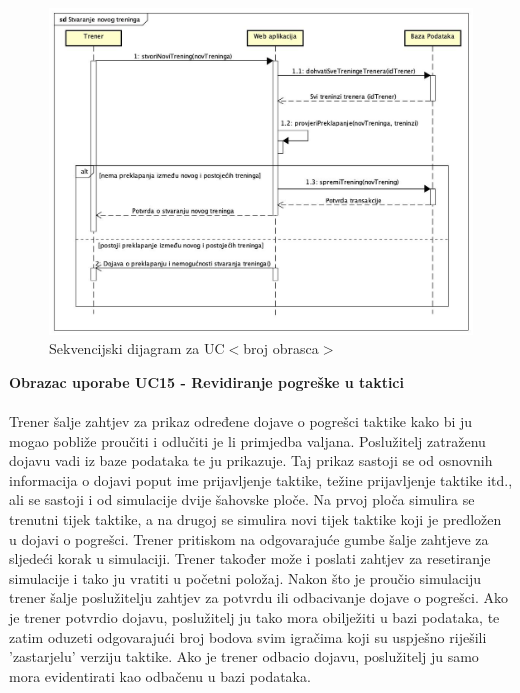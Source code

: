				\begin{figure}[H]
					\centerfloat
        					\includegraphics[scale=0.48]{dijagrami/StvaranjeNovogTreninga.jpg} %
        					\caption{Sekvencijski dijagram za UC$<$broj obrasca$>$}
        					\label{fig:UC$<$broj obrasca$>$}
				\end{figure}
				
				\eject
				
				\textbf{Obrazac uporabe UC15 - Revidiranje pogreške u taktici}\\
				\\Trener šalje zahtjev za prikaz određene dojave o pogrešci taktike kako bi ju mogao pobliže proučiti i odlučiti je li primjedba valjana. Poslužitelj zatraženu dojavu vadi iz baze podataka te ju prikazuje. Taj prikaz sastoji se od osnovnih informacija o dojavi poput ime prijavljenje taktike, težine prijavljenje taktike itd., ali se sastoji i od simulacije dvije šahovske ploče. Na prvoj ploča simulira se trenutni tijek taktike, a na drugoj se simulira novi tijek taktike koji je predložen u dojavi o pogrešci. Trener pritiskom na odgovarajuće gumbe šalje zahtjeve za sljedeći korak u simulaciji. Trener također može i poslati zahtjev za resetiranje simulacije i tako ju vratiti u početni položaj. Nakon što je proučio simulaciju trener šalje poslužitelju zahtjev za potvrdu ili odbacivanje dojave o pogrešci. Ako je trener potvrdio dojavu, poslužitelj ju tako mora obilježiti u bazi podataka, te zatim oduzeti odgovarajući broj bodova svim igračima koji su uspješno riješili 'zastarjelu' verziju taktike. Ako je trener odbacio dojavu, poslužitelj ju samo mora evidentirati kao odbačenu u bazi podataka.
			

